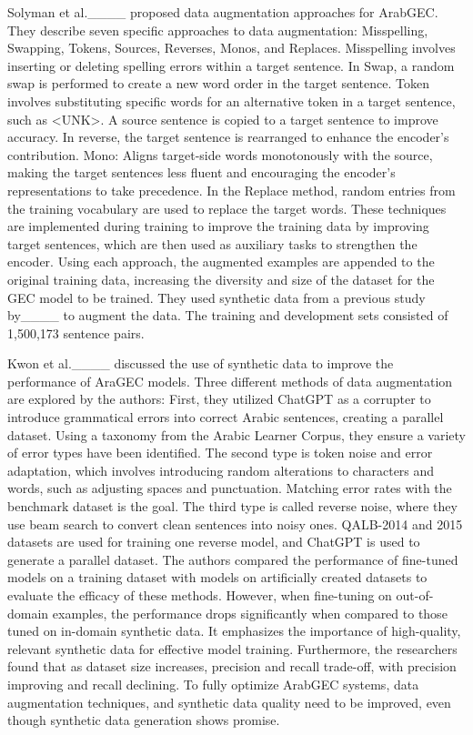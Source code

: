 Solyman et al.____ proposed data augmentation approaches for ArabGEC. They describe seven specific approaches to data augmentation: Misspelling, Swapping, Tokens, Sources, Reverses, Monos, and Replaces.  Misspelling involves inserting or deleting spelling errors within a target sentence. In Swap, a random swap is performed to create a new word order in the target sentence. Token involves substituting specific words for an alternative token in a target sentence, such as <UNK>. A source sentence is copied to a target sentence to improve accuracy. In reverse, the target sentence is rearranged to enhance the encoder's contribution. Mono: Aligns target-side words monotonously with the source, making the target sentences less fluent and encouraging the encoder's representations to take precedence. In the Replace method, random entries from the training vocabulary are used to replace the target words.  These techniques are implemented during training to improve the training data by improving target sentences, which are then used as auxiliary tasks to strengthen the encoder.  Using each approach, the augmented examples are appended to the original training data, increasing the diversity and size of the dataset for the GEC model to be trained. They used synthetic data from a previous study by____ to augment the data. The training and development sets consisted of 1,500,173 sentence pairs.

Kwon et al.____ discussed the use of synthetic data to improve the performance of AraGEC models. Three different methods of data augmentation are explored by the authors: First, they utilized ChatGPT as a corrupter to introduce grammatical errors into correct Arabic sentences, creating a parallel dataset. Using a taxonomy from the Arabic Learner Corpus, they ensure a variety of error types have been identified. The second type is token noise and error adaptation, which involves introducing random alterations to characters and words, such as adjusting spaces and punctuation. Matching error rates with the benchmark dataset is the goal. The third type is called reverse noise, where they use beam search to convert clean sentences into noisy ones. QALB-2014 and 2015 datasets are used for training one reverse model, and ChatGPT is used to generate a parallel dataset. The authors compared the performance of fine-tuned models on a training dataset with models on artificially created datasets to evaluate the efficacy of these methods. However, when fine-tuning on out-of-domain examples, the performance drops significantly when compared to those tuned on in-domain synthetic data. It emphasizes the importance of high-quality, relevant synthetic data for effective model training. Furthermore, the researchers found that as dataset size increases, precision and recall trade-off, with precision improving and recall declining. To fully optimize ArabGEC systems, data augmentation techniques, and synthetic data quality need to be improved, even though synthetic data generation shows promise.

